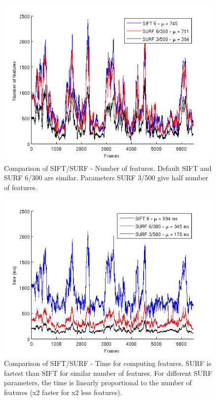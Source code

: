 \begin{figure}[h!]
\begin{center}
\includegraphics[width=1.0\textwidth]{figures/stats_features_nb}
\caption{Comparison of SIFT/SURF - Number of features. Default SIFT and SURF 6/300 are similar. Parameters SURF 3/500 give half number of features.}
\end{center}
\end{figure}

\begin{figure}[h!]
\begin{center}
\includegraphics[width=1.0\textwidth]{figures/stats_features_time}
\caption{Comparison of SIFT/SURF - Time for computing features. SURF is fastest than SIFT for similar number of features. For different SURF parameters, the time is linearly proportional to the number of features (x2 faster for x2 less features).}
\end{center}
\end{figure}

